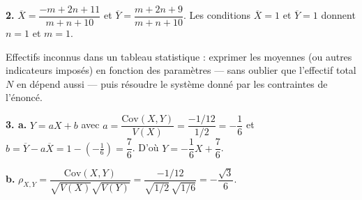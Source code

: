 \documentclass[11pt]{article}
\begin{document}
\textbf{2.} $\overline{X} = \dfrac{-m + 2n + 11}{m + n + 10}$ et $\overline{Y} = \dfrac{m + 2n + 9}{m + n + 10}$. Les conditions $\overline{X} = 1$ et $\overline{Y} = 1$ donnent $n = 1$ et $m = 1$.

\begin{methode}
Effectifs inconnus dans un tableau statistique : exprimer les moyennes
(ou autres indicateurs imposés) en fonction des paramètres — sans
oublier que l'effectif total $N$ en dépend aussi — puis résoudre le
système donné par les contraintes de l'énoncé.
\end{methode}

\textbf{3. a.} $Y = aX + b$ avec $a = \dfrac{\mathrm{Cov}(X,Y)}{V(X)} = \dfrac{-1/12}{1/2} = -\dfrac{1}{6}$ et $b = \overline{Y} - a\overline{X} = 1 - \left(-\tfrac{1}{6}\right) = \dfrac{7}{6}$. D'où $Y = -\dfrac{1}{6}X + \dfrac{7}{6}$.

\textbf{b.} $\rho_{X,Y} = \dfrac{\mathrm{Cov}(X,Y)}{\sqrt{V(X)}\sqrt{V(Y)}} = \dfrac{-1/12}{\sqrt{1/2}\,\sqrt{1/6}} = -\dfrac{\sqrt{3}}{6}$.
\end{document}

